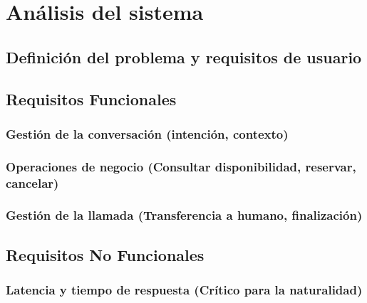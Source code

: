 \chapter{\textbf{Análisis del sistema}}
\label{ch:Analisis}
\thispagestyle{fancy}

\section{Definición del problema y requisitos de usuario}
\label{sec:definicion_problema}

\textoBase

\textoBaseAlt

\section{Requisitos Funcionales}
\label{sec:requisitos_funcionales}

\textoBase

\subsection{Gestión de la conversación (intención, contexto)}
\label{subsec:gestion_conversacion}

\textoBaseAlt

\subsection{Operaciones de negocio (Consultar disponibilidad, reservar, cancelar)}
\label{subsec:operaciones_negocio}

\textoBase

\subsection{Gestión de la llamada (Transferencia a humano, finalización)}
\label{subsec:gestion_llamada}

\textoBaseAlt

\section{Requisitos No Funcionales}
\label{sec:requisitos_no_funcionales}

\textoBase

\subsection{Latencia y tiempo de respuesta (Crítico para la naturalidad)}
\label{subsec:latencia_respuesta}

